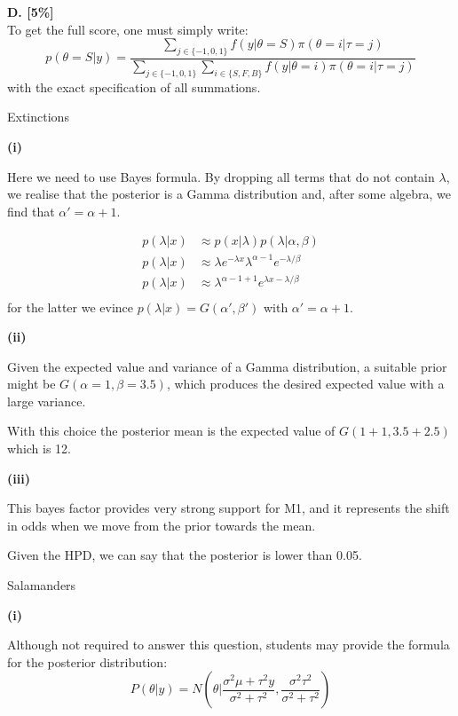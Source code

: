 \documentclass{article}
\begin{document}
\textbf{D. [5\%]}\\

To get the full score, one must simply write:
\begin{equation*}
        p(\theta=S|y) = \frac{\sum_{j \in \{-1,0,1\}} f(y|\theta=S)\pi(\theta=i|\tau=j) } {\sum_{j \in \{-1,0,1\}} \sum_{i \in \{S,F,B\}}f(y|\theta=i)\pi(\theta=i|\tau=j)}
\end{equation*}
with the exact specification of all summations.


Extinctions


\textbf{(i)}

Here we need to use Bayes formula. By dropping all terms that do not contain $\lambda$, we realise that the posterior is a Gamma distribution and, after some algebra, we find that $\alpha'=\alpha+1$.

\begin{align*}
        p(\lambda | x) &\approx p(x | \lambda) p(\lambda | \alpha, \beta) \\
        p(\lambda | x) &\approx \lambda e^{-\lambda x} \lambda^{\alpha-1} e^{-\lambda / \beta} \\
        p(\lambda | x) &\approx \lambda^{\alpha-1+1} e^{\lambda x -\lambda/\beta} \\
\end{align*}
for the latter we evince $p(\lambda | x) = G(\alpha', \beta')$ with $\alpha'=\alpha+1$.

\textbf{(ii)}

Given the expected value and variance of a Gamma distribution, a suitable prior might be $G(\alpha=1, \beta=3.5)$, which produces the desired expected value with a large variance.

With this choice the posterior mean is the expected value of $G(1+1, 3.5+2.5)$ which is 12.


\textbf{(iii)}

This bayes factor provides very strong support for M1, and it represents the shift in odds when we move from the prior towards the mean.

Given the HPD, we can say that the posterior is lower than 0.05.


Salamanders


\textbf{(i)}

Although not required to answer this question, students may provide the formula for the posterior distribution:
\begin{equation*}
  P(\theta|y) = N(\theta|\frac{\sigma^2\mu+\tau^2y}{\sigma^2+\tau^2},\frac{\sigma^2\tau^2}{\sigma^2 + \tau^2})
\end{equation*}
\end{document}
